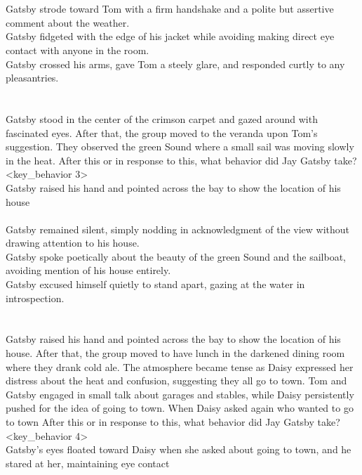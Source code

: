 \begin{tcolorbox}[title = {Behavior Chain}, breakable]
\\<distracters 2>\\
Gatsby strode toward Tom with a firm handshake and a polite but assertive comment about the weather.\\
Gatsby fidgeted with the edge of his jacket while avoiding making direct eye contact with anyone in the room.\\
Gatsby crossed his arms, gave Tom a steely glare, and responded curtly to any pleasantries.\\
\\<context 3>\\
Gatsby stood in the center of the crimson carpet and gazed around with fascinated eyes. After that, the group moved to the veranda upon Tom's suggestion. They observed the green Sound where a small sail was moving slowly in the heat. After this or in response to this, what behavior did Jay Gatsby take?
\\<key\_behavior 3>\\
Gatsby raised his hand and pointed across the bay to show the location of his house
\\<distracters 3>\\
Gatsby remained silent, simply nodding in acknowledgment of the view without drawing attention to his house.\\
Gatsby spoke poetically about the beauty of the green Sound and the sailboat, avoiding mention of his house entirely.\\
Gatsby excused himself quietly to stand apart, gazing at the water in introspection.\\
\\<context 4>\\
Gatsby raised his hand and pointed across the bay to show the location of his house. After that, the group moved to have lunch in the darkened dining room where they drank cold ale. The atmosphere became tense as Daisy expressed her distress about the heat and confusion, suggesting they all go to town. Tom and Gatsby engaged in small talk about garages and stables, while Daisy persistently pushed for the idea of going to town. When Daisy asked again who wanted to go to town After this or in response to this, what behavior did Jay Gatsby take?
\\<key\_behavior 4>\\
Gatsby's eyes floated toward Daisy when she asked about going to town, and he stared at her, maintaining eye contact
\\<distracters 4>\\

\end{tcolorbox}
